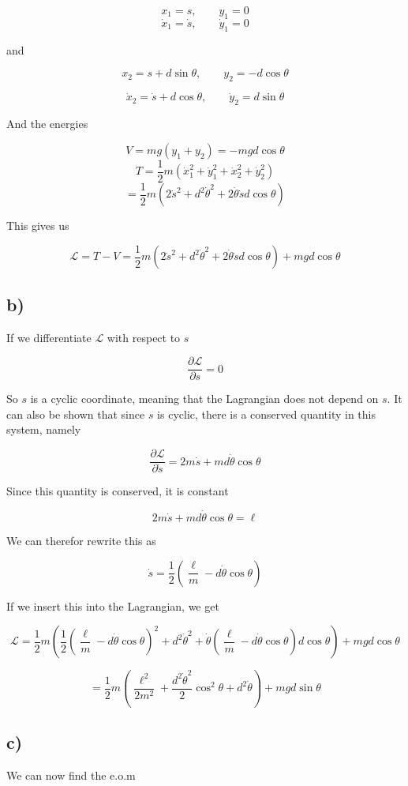 \documentclass[a4paper,norsk, 10pt]{article}
\begin{document}
$$
x_1 = s, \qquad y_1 = 0
$$
$$
\dot{x}_1 = \dot{s}, \qquad \dot{y}_1 = 0
$$

and

$$
x_2 =  s + d\sin \theta, \qquad y_2 = -d\cos \theta
$$

$$
\dot{x}_2 = \dot{s} + d\cos\theta,\qquad \dot{y}_2 = d\sin\theta
$$

And the energies

$$
V = mg(y_1 + y_2) = -mgd\cos\theta
$$
$$
T = \frac{1}{2}m(\dot{x}_1^2 + \dot{y}_1^2 + \dot{x}_2^2 + \dot{y}_2^2)
$$
$$
= \frac{1}{2}m(2\dot{s}^2 +d^2\dot{\theta}^2 + 2\dot{\theta}\dot{s}d\cos\theta) 
$$

This gives us

$$
\mathcal{L} = T -V = \frac{1}{2}m(2\dot{s}^2 +d^2\dot{\theta}^2 + 2\dot{\theta}\dot{s}d\cos\theta) +mgd\cos\theta
$$

\subsection*{b)}
If we differentiate $\mathcal{L}$ with respect to $s$

$$
\frac{\partial \mathcal{L}}{\partial s} = 0
$$

So $s$ is a cyclic coordinate, meaning that the Lagrangian does not depend on $s$. It can also be shown that since $s$ is cyclic, there is a conserved quantity in this system, namely

$$
\frac{\partial \mathcal{L}}{\partial \dot{s}} = 2m\dot{s} + md\dot{\theta}\cos\theta 
$$

Since this quantity is conserved, it is constant

$$
2m\dot{s} + md\dot{\theta}\cos\theta = \ell
$$

We can therefor rewrite this as 

$$
\dot{s} =\frac{1}{2}(\frac{\ell}{m} -d\dot{\theta}\cos\theta)
$$

If we insert this into the Lagrangian, we get

$$
\mathcal{L} = \frac{1}{2}m(\frac{1}{2}(\frac{\ell}{m} -d\dot{\theta}\cos\theta)^2 +d^2\dot{\theta}^2 + \dot{\theta}(\frac{\ell}{m} -d\dot{\theta}\cos\theta)d\cos\theta) +mgd\cos\theta
$$

$$
= \frac{1}{2}m(\frac{\ell^2}{2m^2} + \frac{d^2\dot{\theta}^2}{2}\cos^2\theta + d^2\dot{\theta}) + mgd\sin\theta
$$

\subsection*{c)}
We can now find the e.o.m
\end{document}
